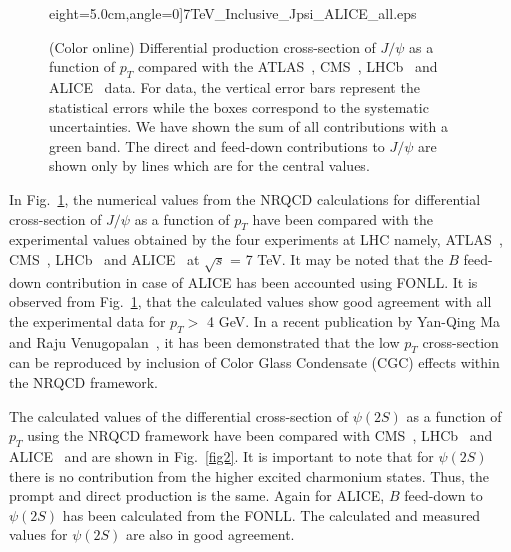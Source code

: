 \documentclass{iopart}
\begin{document}
\begin{figure}[t]
\begin{center}
eight=5.0cm,angle=0]{7TeV_Inclusive_Jpsi_ALICE_all.eps}
\end{center}
\caption{(Color online) Differential production cross-section of $J/\psi$ as a function of $p_{T}$ compared with the ATLAS~\cite{npb850}, CMS~\cite{jhep02}, LHCb~\cite{epjc71} and ALICE~\cite{plb718,epjc} data. For data, the vertical error bars represent the statistical errors while the boxes correspond to the systematic uncertainties. We have shown the sum of all contributions with a green band. The direct and feed-down contributions to $J/\psi$ are shown only by lines which are for the central values.}
\label{fig1}
\end{figure}

In Fig.~\ref{fig1}, the numerical values from the NRQCD calculations for differential cross-section of $J/\psi$ as a function of $p_T$ have been compared with the experimental values obtained by the four experiments at LHC namely, ATLAS~\cite{npb850}, CMS~\cite{jhep02}, LHCb~\cite{epjc71} and ALICE~\cite{epjc} at $\sqrt{s}$ = 7 TeV. It may be noted that the $B$ feed-down contribution in case of ALICE has been accounted using FONLL. It is observed from Fig.~\ref{fig1}, that the calculated values show good agreement with all the experimental data for $p_T>$ 4 GeV. In a recent publication by Yan-Qing Ma and Raju Venugopalan~\cite{raju}, it has been demonstrated that the low $p_T$ cross-section can be reproduced by inclusion of Color Glass Condensate (CGC) effects within the NRQCD framework.

The calculated values of the differential cross-section of $\psi(2S)$ as a function of $p_T$ using the NRQCD framework have been compared with CMS~\cite{jhep02}, LHCb~\cite{epjc72} and ALICE~\cite{epjc} and are shown in Fig.~\ref{fig2}. It is important to note that for $\psi(2S)$ there is no contribution from the higher excited charmonium states. Thus, the prompt and direct production is the same. Again for ALICE, $B$ feed-down to $\psi(2S)$ has been calculated from the FONLL. The calculated and measured values for $\psi(2S)$ are also in good agreement.
\end{document}
